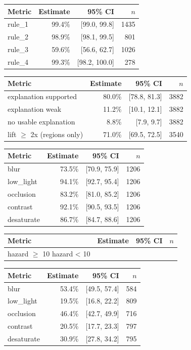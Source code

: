 \begin{tabular}{lrrr}
\toprule
Metric & Estimate & 95\% CI & $n$ \\
\midrule
rule\_1 & 99.4\% & [99.0, 99.8] & 1435 \\
rule\_2 & 98.9\% & [98.1, 99.5] & 801 \\
rule\_3 & 59.6\% & [56.6, 62.7] & 1026 \\
rule\_4 & 99.3\% & [98.2, 100.0] & 278 \\
\bottomrule
\end{tabular}

\begin{tabular}{lrrr}
\toprule
Metric & Estimate & 95\% CI & $n$ \\
\midrule
explanation supported & 80.0\% & [78.8, 81.3] & 3882 \\
explanation weak & 11.2\% & [10.1, 12.1] & 3882 \\
no usable explanation & 8.8\% & [7.9, 9.7] & 3882 \\
lift $\geq$ 2x (regions only) & 71.0\% & [69.5, 72.5] & 3540 \\
\bottomrule
\end{tabular}

\begin{tabular}{lrrr}
\toprule
Metric & Estimate & 95\% CI & $n$ \\
\midrule
blur & 73.5\% & [70.9, 75.9] & 1206 \\
low\_light & 94.1\% & [92.7, 95.4] & 1206 \\
occlusion & 83.2\% & [81.0, 85.2] & 1206 \\
contrast & 92.1\% & [90.5, 93.5] & 1206 \\
desaturate & 86.7\% & [84.7, 88.6] & 1206 \\
\bottomrule
\end{tabular}

\begin{tabular}{lrrr}
\toprule
Metric & Estimate & 95\% CI & $n$ \\
\midrule
hazard $\geq$ 10%
hazard < 10%
\bottomrule
\end{tabular}

\begin{tabular}{lrrr}
\toprule
Metric & Estimate & 95\% CI & $n$ \\
\midrule
blur & 53.4\% & [49.5, 57.4] & 584 \\
low\_light & 19.5\% & [16.8, 22.2] & 809 \\
occlusion & 46.4\% & [42.7, 49.9] & 716 \\
contrast & 20.5\% & [17.7, 23.3] & 797 \\
desaturate & 30.9\% & [27.8, 34.2] & 795 \\
\bottomrule
\end{tabular}

